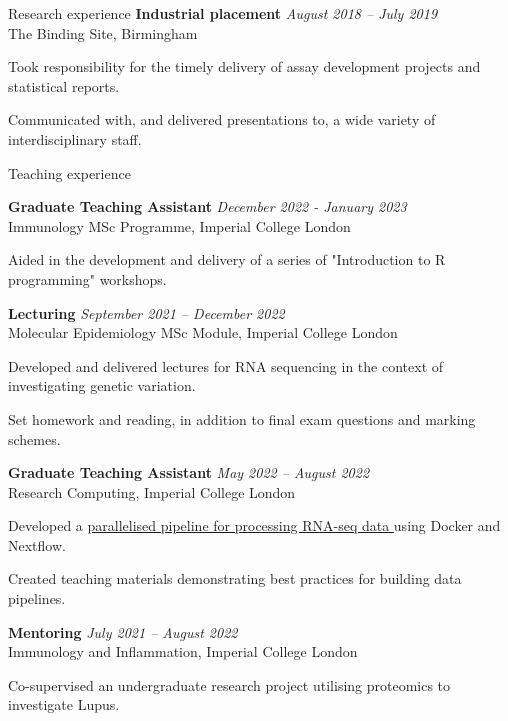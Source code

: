 \documentclass{resume}
\begin{document}
\begin{rSection}{Research experience}
\textbf{Industrial placement} \hfill \textit{August 2018 -- July 2019} \\
The Binding Site, Birmingham

\vspace{2pt plus 1pt minus 1pt}
\item Took responsibility for the timely delivery of assay development projects and statistical reports.
\item Communicated with, and delivered presentations to, a wide variety of interdisciplinary staff.

\end{rSection}
\begin{rSection}{Teaching experience}

\textbf{Graduate Teaching Assistant} \hfill  \textit{December 2022 - January 2023} \\
Immunology MSc Programme, Imperial College London
\vspace{2pt plus 1pt minus 1pt}
\item Aided in the development and delivery of a series of "Introduction to R programming" workshops.

\textbf{Lecturing} \hfill  \textit{September 2021 -- December 2022} \\
Molecular Epidemiology MSc Module, Imperial College London
\vspace{2pt plus 1pt minus 1pt}
\item Developed and delivered lectures for RNA sequencing in the context of investigating genetic variation. 
\item Set homework and reading, in addition to final exam questions and marking schemes.

\pagebreak

\textbf{Graduate Teaching Assistant} \hfill  \textit{May 2022 -- August 2022} \\
Research Computing, Imperial College London
\vspace{2pt plus 1pt minus 1pt}
\item Developed a \href{https://github.com/ImperialCollegeLondon/ReCoDE_rnaseq_pipeline}{parallelised pipeline for processing RNA-seq data \faGithub} using Docker and Nextflow. 
\item Created teaching materials demonstrating best practices for building data pipelines.

\textbf{Mentoring} \hfill  \textit{July 2021 -- August 2022} \\
Immunology and Inflammation, Imperial College London
\vspace{2pt plus 1pt minus 1pt}
\item Co-supervised an undergraduate research project utilising proteomics to investigate Lupus.

\end{rSection}
\end{document}
